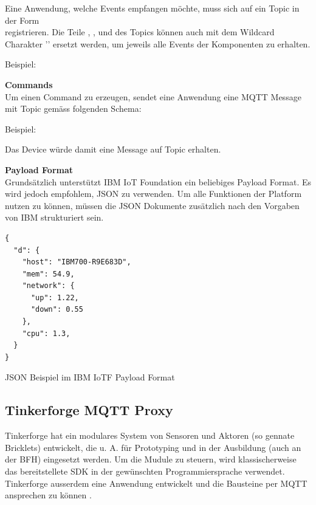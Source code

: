 Eine Anwendung, welche Events empfangen möchte, muss sich auf ein Topic in der Form \\
 registrieren.
Die Teile , ,  und  des Topics können auch mit dem Wildcard Charakter '\code{+}' ersetzt werden, um jeweils alle Events der Komponenten zu erhalten. 

Beispiel: 

\textbf{Commands} \\
Um einen Command zu erzeugen, sendet eine Anwendung eine MQTT Message mit Topic gemäss folgenden Schema:

Beispiel: 

Das Device  würde damit eine Message auf Topic  erhalten.


\textbf{Payload Format} \\
Grundsätzlich unterstützt IBM IoT Foundation ein beliebiges Payload Format. Es wird jedoch empfohlem, JSON zu verwenden. Um alle Funktionen der Platform nutzen zu können, müssen die JSON Dokumente zusätzlich nach den Vorgaben \cite{ibmIotF:payload} von IBM strukturiert sein.

\begin{listing}[H]
\begin{verbatim}
{
  "d": {
    "host": "IBM700-R9E683D",
    "mem": 54.9,
    "network": {
      "up": 1.22,
      "down": 0.55
    },
    "cpu": 1.3,
  }
}
\end{verbatim}
\caption{JSON Beispiel im IBM IoTF Payload Format}
\end{listing}



\subsection{Tinkerforge MQTT Proxy}

Tinkerforge hat ein modulares System von Sensoren und Aktoren (so gennate Bricklets) entwickelt, die u. A. für Prototyping und in der Ausbildung (auch an der BFH) eingesetzt werden. Um die Mudule zu steuern, wird klassischerweise das bereitstellete SDK in der gewünschten Programmiersprache verwendet. 
Tinkerforge ausserdem eine Anwendung entwickelt und die Bausteine per MQTT ansprechen zu können \cite{tinkerf:mqtt}.

